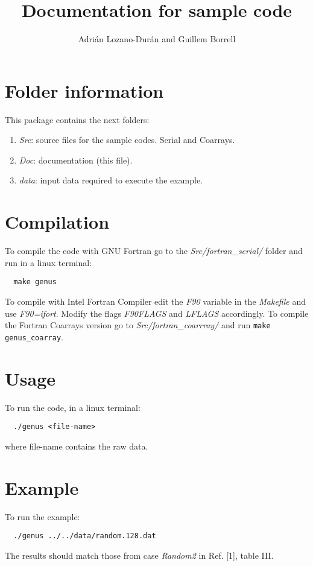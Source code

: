 \documentclass[a4paper,10pt]{article}
\title{Documentation for sample code}
\author{Adri\'an Lozano-Dur\'an and Guillem Borrell}
\begin{document}
\maketitle

\section{Folder information}

This package contains the next folders:
\begin{enumerate}
 \item \emph{Src}:  source files for the sample codes. Serial and Coarrays.
 \item \emph{Doc}:  documentation (this file).
 \item \emph{data}: input data required to execute the example.
\end{enumerate}

\section{Compilation}

\noindent To compile the code with GNU Fortran go to the
\emph{Src/fortran\_serial/} folder and run in a linux terminal:
%
\begin{verbatim}
  make genus
\end{verbatim}
%
\noindent To compile with Intel\textsuperscript{\textregistered}
Fortran Compiler edit the \emph{F90} variable in the \emph{Makefile}
and use \emph{F90=ifort}. Modify the flags \emph{F90FLAGS} and
\emph{LFLAGS} accordingly. To compile the Fortran Coarrays version go
to \emph{Src/fortran\_coarrray/} and run \verb|make genus_coarray|.

\section{Usage}
%
\noindent To run the code, in a linux terminal:
\begin{verbatim}
  ./genus <file-name>
\end{verbatim}
where file-name contains the raw data.

\section{Example}

\noindent To run the example:
\begin{verbatim}
  ./genus ../../data/random.128.dat
\end{verbatim}
The results should match those from case \emph{Random2} in Ref. [1],
table III.
\end{document}
